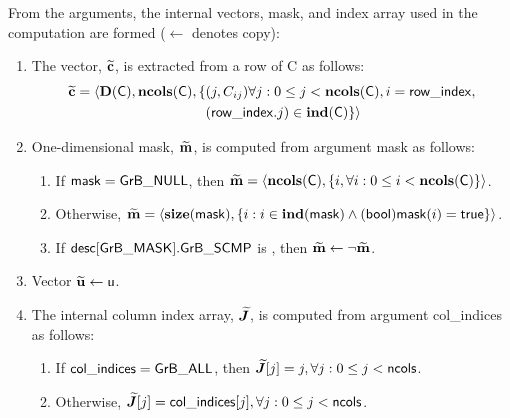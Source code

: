 From the arguments, the internal vectors, mask, and index array used in 
the computation are formed ($\leftarrow$ denotes copy):
\begin{enumerate}
	\item The vector, ${\bf \widetilde{c}}$, is extracted from a row of {\sf C}
    as follows:
    \[
    \begin{aligned}
        {\bf \widetilde{c}} = \langle  \bold{D}({\sf C}), \bold{ncols}({\sf C}), 
        \{ & (j, C_{ij}) \forall j : 0 \leq j < \bold{ncols}({\sf C}),
        i = {\sf row\_index}, \\
        & ({\sf row\_index}. j) \in \bold{ind}({\sf C})\} \rangle
    \end{aligned}
    \]

	\item One-dimensional mask, ${\bf \widetilde{m}}$, is computed from 
    argument {\sf mask} as follows:
	\begin{enumerate}
		\item	If ${\sf mask} = {\sf GrB\_NULL}$, then ${\bf \widetilde{m}} = 
        \langle \bold{ncols}({\sf C}), \{i, \forall i : 0 \leq i < 
        \bold{ncols}({\sf C}) \} \rangle$.

		\item	Otherwise, ${\bf \widetilde{m}} = 
        \langle \bold{size}({\sf mask}), \{i :  i \in \bold{ind}({\sf mask}) \wedge
        ({\sf bool}){\sf mask}(i) = {\sf true} \} \rangle$.

		\item	If ${\sf desc[GrB\_MASK].GrB\_SCMP}$ is \true, then 
        ${\bf \widetilde{m}} \leftarrow \neg {\bf \widetilde{m}}$.
	\end{enumerate}

	\item Vector ${\bf \widetilde{u}} \leftarrow {\sf u}$.
    
    \item The internal column index array, $\bm{\widetilde{J}}$, is computed from 
    argument {\sf col\_indices} as follows:
	\begin{enumerate}
		\item	If ${\sf col\_indices} = {\sf GrB\_ALL}$, then 
        $\bm{\widetilde{J}}[j] = j, \forall j : 0 \leq j < {\sf ncols}$.

		\item	Otherwise, $\bm{\widetilde{J}}[j] = {\sf col\_indices}[j], 
        \forall j : 0 \leq j < {\sf ncols}$.
    \end{enumerate}
\end{enumerate}

